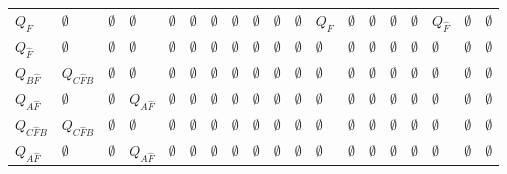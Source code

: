 \documentclass[a4paper,11pt]{article}
\begin{document}
\begin{table}[]
{\begin{tabular}{@{}lllllllllllllllllll@{}}
$Q_{F}$         & $\emptyset$     & $\emptyset$    & $\emptyset$    & $\emptyset$   & $\emptyset$   & $\emptyset$   & $\emptyset$   & $\emptyset$   & $\emptyset$   & $\emptyset$    & $Q_{F}$     & $\emptyset$  & $\emptyset$ & $\emptyset$ & $\emptyset$   & $Q_{\hat{F}}$ & $\emptyset$   & $\emptyset$   \\
$Q_{\hat{F}}$   & $\emptyset$     & $\emptyset$    & $\emptyset$    & $\emptyset$   & $\emptyset$   & $\emptyset$   & $\emptyset$   & $\emptyset$   & $\emptyset$   & $\emptyset$    & $\emptyset$ & $\emptyset$  & $\emptyset$ & $\emptyset$ & $\emptyset$   & $\emptyset$   & $\emptyset$   & $\emptyset$   \\
$Q_{B\hat{F}}$  & $Q_{C\hat{F}B}$ & $\emptyset$    & $\emptyset$    & $\emptyset$   & $\emptyset$   & $\emptyset$   & $\emptyset$   & $\emptyset$   & $\emptyset$   & $\emptyset$    & $\emptyset$ & $\emptyset$  & $\emptyset$ & $\emptyset$ & $\emptyset$   & $\emptyset$   & $\emptyset$   & $\emptyset$   \\
$Q_{A\hat{F}}$  & $\emptyset$     & $\emptyset$    & $Q_{A\hat{F}}$ & $\emptyset$   & $\emptyset$   & $\emptyset$   & $\emptyset$   & $\emptyset$   & $\emptyset$   & $\emptyset$    & $\emptyset$ & $\emptyset$  & $\emptyset$ & $\emptyset$ & $\emptyset$   & $\emptyset$   & $\emptyset$   & $\emptyset$   \\
$Q_{C\hat{F}B}$ & $Q_{C\hat{F}B}$ & $\emptyset$    & $\emptyset$    & $\emptyset$   & $\emptyset$   & $\emptyset$   & $\emptyset$   & $\emptyset$   & $\emptyset$   & $\emptyset$    & $\emptyset$ & $\emptyset$  & $\emptyset$ & $\emptyset$ & $\emptyset$   & $\emptyset$   & $\emptyset$   & $\emptyset$   \\
$Q_{A\hat{F}}$  & $\emptyset$     & $\emptyset$    & $Q_{A\hat{F}}$ & $\emptyset$   & $\emptyset$   & $\emptyset$   & $\emptyset$   & $\emptyset$   & $\emptyset$   & $\emptyset$    & $\emptyset$ & $\emptyset$  & $\emptyset$ & $\emptyset$ & $\emptyset$   & $\emptyset$   & $\emptyset$   & $\emptyset$   \\ \bottomrule
\end{tabular}%
}
\end{table}


\end{document}
